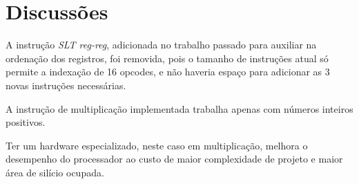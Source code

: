\documentclass[11pt,a4paper,titlepage]{article}
\begin{document}
\section{Discussões}

A instrução \textit{SLT reg-reg}, adicionada no trabalho passado para auxiliar na ordenação dos registros, foi removida, pois o tamanho de instruções atual só permite a indexação de 16 opcodes, e não haveria espaço para adicionar as 3 novas instruções necessárias.

A instrução de multiplicação implementada trabalha apenas com números inteiros positivos.

Ter um hardware especializado, neste caso em multiplicação, melhora o desempenho do processador ao custo de maior complexidade de projeto e maior área de silício ocupada.


%

\nocite{*}
\end{document}
